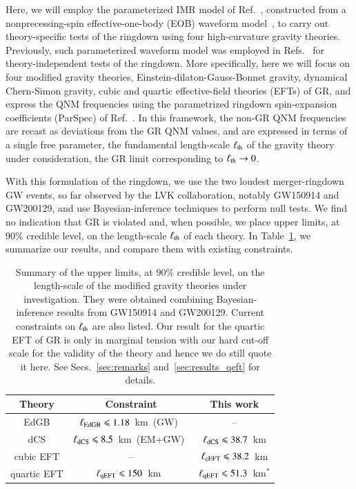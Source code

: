 \documentclass[twocolumn,
               prd,
               aps,
               superscriptaddress,
               tightenlines,
               nofootinbib,
               eqsecnum,
               amsfonts,
               amsmath,
               longbibliography]{revtex4-1}
\newcommand{\hs}[1]{{\textcolor{TealBlue}{{#1}}}}
\begin{document}
Here, we will employ the parameterized IMR model of Ref.~\cite{Ghosh:2021mrv}, constructed from a nonprecessing-spin effective-one-body (EOB) waveform model~\cite{Bohe:2016gbl,Cotesta:2018fcv,Mihaylov:2021bpf}, to carry out theory-specific tests of the
ringdown using four high-curvature gravity theories. Previously, such parameterized
waveform model was employed in Refs.~\cite{Abbott:2020jks,LIGOScientific:2021sio} for theory-independent tests of the ringdown.
%
More specifically, here we will focus on four modified gravity theories, Einstein-dilaton-Gauss-Bonnet gravity, dynamical
Chern-Simon gravity, cubic and quartic effective-field theories (EFTs) of GR, and
express the QNM frequencies using the parametrized ringdown spin-expansion coefficients (ParSpec)
of Ref.~\cite{Maselli:2019mjd}.
%
In this framework, the non-GR QNM frequencies are
recast as deviations from the GR QNM values, and are expressed in terms of a single free parameter,
the fundamental length-scale $\ell_{\rm th}$ of the gravity theory under consideration, the GR limit
corresponding to $\ell_{\rm th} \rightarrow 0$.

With this formulation of the ringdown, we use the two loudest merger-ringdown GW events, so far
observed by the LVK collaboration, notably GW150914 and GW200129, and use Bayesian-inference techniques to
perform null tests. We find no indication that GR is violated and, when possible, we place upper limits, at $90\%$ credible level,
on the length-scale $\ell_{\rm th}$ of each theory. In Table~\ref{tab:bound_summary}, we summarize our results, and compare
them with existing constraints.

\begin{table}[t]
\begin{tabular}{c | c c}
\hline \hline
Theory & Constraint & This work \\
\hline
EdGB        & $\ell_{\rm EdGB} \leqslant 1.18$~km~(GW)~\cite{Lyu:2022gdr} & -- \\
dCS         & $\ell_{\rm dCS} \leqslant 8.5$~km~(EM+GW)~\cite{Silva:2020acr}  & $\ell_{\rm dCS} \leqslant 38.7$~km \\
cubic EFT   & -- & $\ell_{\rm cEFT} \leqslant 38.2$~km \\
quartic EFT & $\ell_{\rm qEFT} \leqslant 150$~km~\cite{Sennett:2019bpc}  & $\ell_{\rm qEFT} \leqslant 51.3$~km\hs{$^{\ast}$} \\
\hline \hline
\end{tabular}
\caption{Summary of the upper limits, at $90\%$ credible level,
on the length-scale of the modified gravity theories under investigation.
They were obtained combining Bayesian-inference results from GW150914 and GW200129.
Current constraints on $\ell_{\rm th}$ are also listed.
%
\hs{Our result for the quartic EFT of GR is only in marginal tension with our hard cut-off scale for the
validity of the theory and hence we do still quote it here. See Secs.~\ref{sec:remarks} and~\ref{sec:results_qeft}
for details.}
}
\label{tab:bound_summary}
\end{table}
\end{document}
